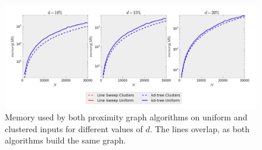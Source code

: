 \begin{figure}[!h] 
	\centering 
	\vspace{-10pt}
    \includegraphics[width=\linewidth]{Pictures/ls_kd_s}
    \caption[Memory used by Line Sweep and $k$-d Tree range search.]{Memory used by both proximity graph algorithms on uniform and clustered inputs for different values of $d$. The lines overlap, as both algorithms build the same graph.}
    \label{fig:ls_kd_s} 
\end{figure}

